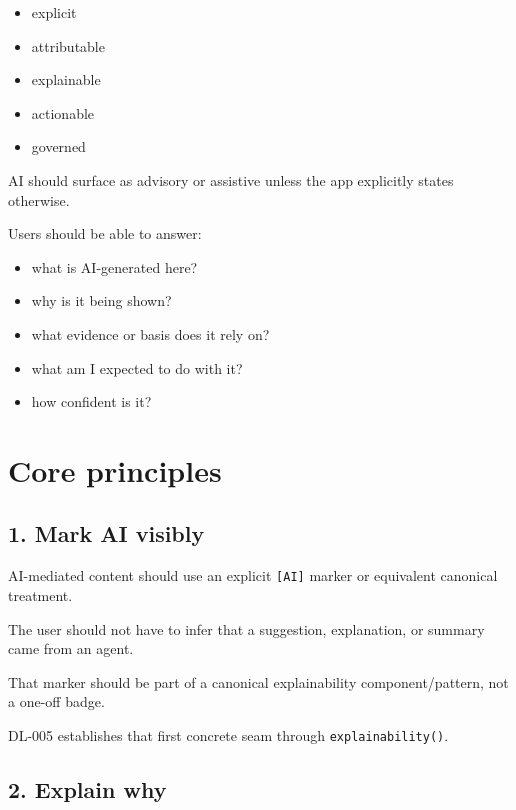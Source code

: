 \begin{itemize}
\tightlist
\item
  explicit
\item
  attributable
\item
  explainable
\item
  actionable
\item
  governed
\end{itemize}

AI should surface as advisory or assistive unless the app explicitly states otherwise.

Users should be able to answer:

\begin{itemize}
\tightlist
\item
  what is AI-generated here?
\item
  why is it being shown?
\item
  what evidence or basis does it rely on?
\item
  what am I expected to do with it?
\item
  how confident is it?
\end{itemize}

\section{Core principles}\label{record-033-core-principles}

\subsection{1. Mark AI visibly}\label{record-033-mark-ai-visibly}

AI-mediated content should use an explicit \texttt{[\allowbreak{}A\allowbreak{}I\allowbreak{}]} marker or equivalent canonical treatment.

The user should not have to infer that a suggestion, explanation, or summary came from an agent.

That marker should be part of a canonical explainability component/pattern, not a one-off badge.

DL-005 establishes that first concrete seam through \texttt{e\allowbreak{}x\allowbreak{}p\allowbreak{}l\allowbreak{}a\allowbreak{}i\allowbreak{}n\allowbreak{}a\allowbreak{}b\allowbreak{}i\allowbreak{}l\allowbreak{}i\allowbreak{}t\allowbreak{}y\allowbreak{}(\allowbreak{})}.

\subsection{2. Explain why}\label{record-033-explain-why}

